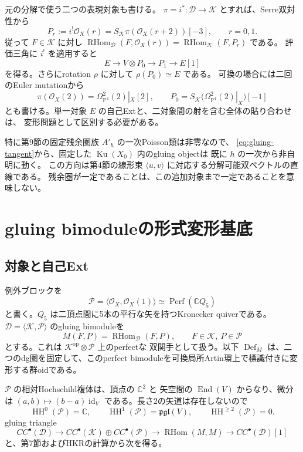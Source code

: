 \documentclass[a4paper,11pt]{ltjsarticle}
\theoremstyle{definition}
\newcommand{\CC}{\mathbb C}
\newcommand{\OO}{\mathcal O}
\newcommand{\PP}{\mathbb P}
\newcommand{\Ku}{\operatorname{Ku}}
\newcommand{\HH}{\operatorname{HH}}
\newcommand{\Def}{\operatorname{Def}}
\newcommand{\Perf}{\operatorname{Perf}}
\newcommand{\RHom}{\operatorname{RHom}}
\newcommand{\id}{\operatorname{id}}
\begin{document}
元の分解で使う二つの表現対象も書ける。
$\pi=i^*:\mathcal D\to\mathcal K$ とすれば、Serre双対性から
\[
 P_r:=i^!\OO_X(r)=S_{\mathcal K}\pi(\OO_X(r+2))[-3],
 \qquad r=0,1.
\]
従って $F\in\mathcal K$ に対し
$\RHom_{\mathcal D}(F,\OO_X(r))=\RHom_{\mathcal K}(F,P_r)$ である。
評価三角に $i^!$ を適用すると
\[
 E\longrightarrow V\otimes P_0\longrightarrow P_1\longrightarrow E[1]
\]
を得る。さらにrotation $\rho$ に対して
$\rho(P_0)\simeq E$ である\cite[Remark 7.2]{FLZ}。
可換の場合には二回のEuler mutationから
\[
 \pi(\OO_X(2))=\Omega^2_{\PP^4}(2)|_X[2],\qquad
 P_0=S_{\mathcal K}\bigl(\Omega^2_{\PP^4}(2)|_X\bigr)[-1]
\]
とも書ける。単一対象 $E$ の自己Extと、二対象間の射を含む全体の貼り合わせは、
変形問題として区別する必要がある。

特に第9節の固定残余圏族 $A'_h$ の一次Poisson類は非零なので、
\eqref{eq:gluing-tangent}から、固定した $\Ku(X_0)$ 内のgluing objectは
既に $h$ の一次から非自明に動く。
この方向は第4節の線形束 $\langle u,v\rangle$ に対応する分解可能双ベクトルの直線である。
残余圏が一定であることは、この追加対象まで一定であることを意味しない。

\section{gluing bimoduleの形式変形基底}\label{sec:gluing-moduli}

\subsection{対象と自己Ext}

例外ブロックを
\[
 \mathcal P=\langle\OO_X,\OO_X(1)\rangle
 \simeq\Perf(\CC Q_5)
\]
と書く。$Q_5$ は二頂点間に5本の平行な矢を持つKronecker quiverである。
$\mathcal D=\langle\mathcal K,\mathcal P\rangle$ のgluing bimoduleを
\[
 M(F,P)=\RHom_{\mathcal D}(F,P),\qquad
 F\in\mathcal K,\ P\in\mathcal P
\]
とする。これは $\mathcal K^{\mathrm{op}}\otimes\mathcal P$ 上のperfectな
双関手として扱う。以下 $\Def_M$ は、二つのdg圏を固定して、このperfect
bimoduleを可換局所Artin環上で標識付きに変形する群oidである。

$\mathcal P$ の相対Hochschild複体は、頂点の $\CC^2$ と
矢空間の $\operatorname{End}(V)$ からなり、微分は
$(a,b)\mapsto(b-a)\id_V$ である。長さ2の矢道は存在しないので
\[
 \HH^0(\mathcal P)=\CC,\qquad
 \HH^1(\mathcal P)=\mathfrak{pgl}(V),\qquad
 \HH^{\ge2}(\mathcal P)=0.
\]
gluing triangle
\begin{equation}\label{eq:full-gluing-triangle}
 CC^\bullet(\mathcal D)\longrightarrow
 CC^\bullet(\mathcal K)\oplus CC^\bullet(\mathcal P)
 \longrightarrow\RHom(M,M)\longrightarrow CC^\bullet(\mathcal D)[1]
\end{equation}
と、第7節およびHKRの計算から次を得る。
\end{document}
